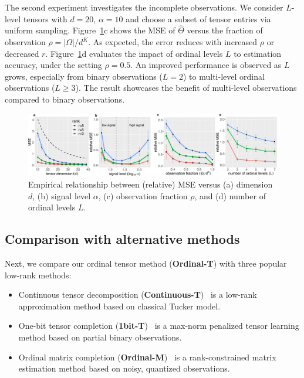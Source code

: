\documentclass{article}
\theoremstyle{plain}
\theoremstyle{definition}
\begin{document}
The second experiment investigates the incomplete observations. We consider $L$-level tensors with $d=20$, $\alpha=10$ and choose a subset of tensor entries via uniform sampling. Figure~\ref{fig:finite}c shows the  MSE of $\hat \Theta$ versus the fraction of observation $\rho=|\Omega|/d^K$. As expected, the error reduces with increased $\rho$ or decreased $r$. Figure~\ref{fig:finite}d evaluates the impact of ordinal levels $L$ to estimation accuracy, under the setting $\rho=0.5$. An improved performance is observed as $L$ grows, especially from binary observations ($L=2$) to multi-level ordinal observations ($L\geq 3$). The result showcases the benefit of multi-level observations compared to binary observations.
\vspace{-.3cm}
\begin{figure}[http]
\centering\includegraphics[width=14cm]{panel.pdf}
\vspace{-.4cm}
\caption{\footnotesize Empirical relationship between (relative) MSE versus (a) dimension $d$, (b) signal level $\alpha$, (c) observation fraction $\rho$, and (d) number of ordinal levels $L$.}
\label{fig:finite}
\vspace{-.4cm}
\end{figure}

\vspace{-.2cm}
\subsection{Comparison with alternative methods}
\vspace{-.2cm}
Next, we compare our ordinal tensor method ({\bf Ordinal-T}) with three popular low-rank methods:

\begin{itemize}[itemsep=-.5pt,topsep=-.5pt,leftmargin=*,partopsep=-.5pt]
\item Continuous tensor decomposition ({\bf Continuous-T})~\cite{acar2010scalable} is a low-rank approximation method based on classical Tucker model.
\item One-bit tensor completion ({\bf 1bit-T})~\cite{ghadermarzy2018learning} is a max-norm penalized tensor learning method based on partial binary observations.
\item Ordinal matrix completion ({\bf Ordinal-M})~\cite{bhaskar2016probabilistic} is a rank-constrained matrix estimation method based on noisy, quantized observations.
\end{itemize}
\end{document}
